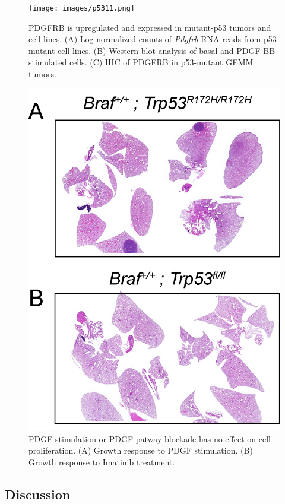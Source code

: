 \begin{figure}
\hypertarget{fig:04}{%
\centering
\texttt{[image: images/p5311.png]}
\caption{PDGFRB is upregulated and expressed in mutant-p53 tumors and cell lines. (A) Log-normalized counts of \emph{Pdgfrb} RNA reads from p53-mutant cell lines. (B) Western blot analysis of basal and PDGF-BB stimulated cells. (C) IHC of PDGFRB in p53-mutant GEMM tumors.}\label{fig:04}
}
\end{figure}

\begin{figure}
\hypertarget{fig:04}{%
\centering
\includegraphics[width=1\textwidth,height=\textheight]{images/p5312.png}
\caption{PDGF-stimulation or PDGF patway blockade has no effect on cell proliferation. (A) Growth response to PDGF stimulation. (B) Growth response to Imatinib treatment.}\label{fig:04}
}
\end{figure}

\hypertarget{discussion-1}{%
\subsection{Discussion}\label{discussion-1}}

